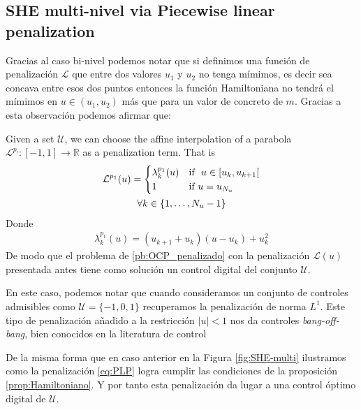 \subsection{SHE multi-nivel via Piecewise linear penalization}

Gracias al caso bi-nivel podemos notar que si definimos una función de penalización $\mathcal{L}$ que entre dos valores $u_1$ y $u_2$ no tenga mímimos, es decir sea concava entre esos dos puntos entonces la función Hamiltoniana no tendrá el mímimos en $u \in (u_1,u_2)$ más que para un valor de concreto de $m$. Gracias a esta observación podemos afirmar que:

\vspace{1em}
\begin{theorem}\label{th:PLP}
    Given a set $\mathcal{U}$, we can choose the affine interpolation of a parabola $\mathcal{L}^{p_!}:[-1,1] \rightarrow \mathbb{R}$ as a penalization term. That is
    \begin{gather}\label{eq:PLP}
        \mathcal{L}^{p_1}(u) = \begin{cases}
            \lambda_k^{p_1}(u) & \text{if }  u \in [u_k,u_{k+1}[ \\
            1 & \text{if } u = u_{N_u} 
        \end{cases} \\
        \notag \forall k \in \{1,\dots,N_u-1\} 
    \end{gather}
    Donde 
    \begin{gather}
        \lambda_k^{p_1}(u) = (u_{k+1}+u_{k}) (u-u_k) + u_k^2
    \end{gather}
    De modo que el problema de \ref{pb:OCP_penalizado} con la penalización $\mathcal{L}(u)$ presentada antes tiene como solución un control digital del conjunto $\mathcal{U}$.
\end{theorem}
\vspace{1em}
\begin{remark}
    En este caso, podemos notar que cuando consideramos un conjunto de controles admisibles como $\mathcal{U}= \{-1,0,1\}$ recuperamos la penalización de norma $L^1$. Este tipo de penalización añadido a la restricción $|u|<1$ nos da controles \emph{bang-off-bang}, bien conocidos en la literatura de control \cite{Wang2020}
\end{remark}

De la misma forma que en caso anterior en la Figura \ref{fig:SHE-multi} ilustramos como la penalización \eqref{eq:PLP} logra cumplir las condiciones de la proposición \ref{prop:Hamiltoniano}. Y por tanto esta penalización da lugar a una control óptimo digital de $\mathcal{U}$. 


